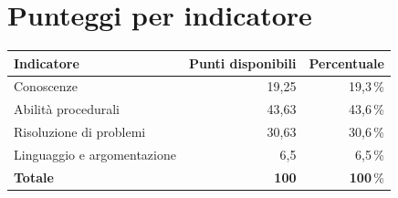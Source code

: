 \documentclass[11pt,a4paper]{article}
\begin{document}
\section*{Punteggi per indicatore}
\begin{center}
\begin{tabular}{@{}lrr@{}}
\toprule
\textbf{Indicatore} & \textbf{Punti disponibili} & \textbf{Percentuale} \\
\midrule

Conoscenze & 19,25 & 19,3\,\% \\

Abilità procedurali & 43,63 & 43,6\,\% \\

Risoluzione di problemi & 30,63 & 30,6\,\% \\

Linguaggio e argomentazione & 6,5 & 6,5\,\% \\

\midrule
\textbf{Totale} & \textbf{100} & \textbf{100}\,\% \\
\bottomrule
\end{tabular}
\end{center}
\end{document}
